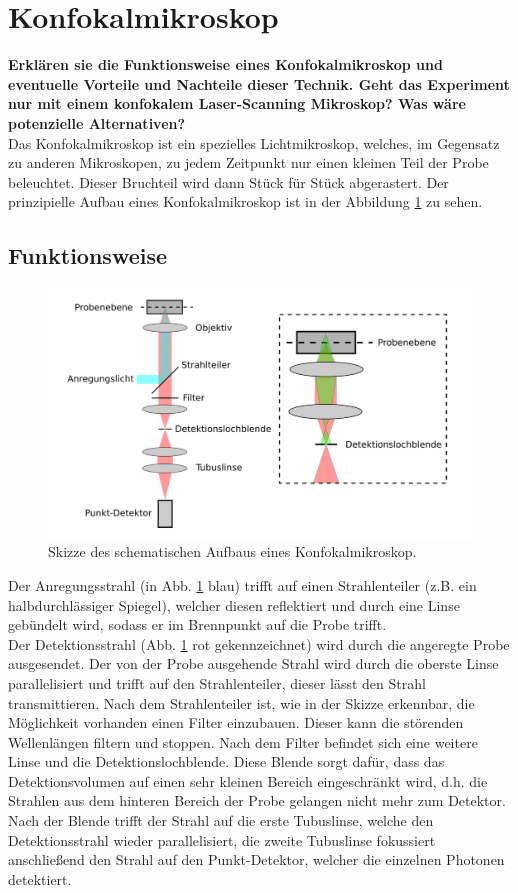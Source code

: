 \section{Konfokalmikroskop}
\textbf{Erklären sie die Funktionsweise eines Konfokalmikroskop und eventuelle Vorteile und
Nachteile dieser Technik. Geht das Experiment nur mit einem konfokalem Laser-Scanning Mikroskop? 
Was wäre potenzielle Alternativen?}\\
Das Konfokalmikroskop ist ein spezielles Lichtmikroskop, welches, 
im Gegensatz zu anderen Mikroskopen, zu jedem Zeitpunkt nur einen kleinen
Teil der Probe beleuchtet. Dieser Bruchteil wird dann Stück für 
Stück abgerastert.
Der prinzipielle Aufbau eines Konfokalmikroskop ist in der Abbildung \ref{fig:Konfokalmikroskop} zu sehen.
\newpage
\subsection{Funktionsweise}
\begin{figure}[h]
    \centering
    \includegraphics[scale=0.6]{Bilder/FzV/Konfokalmikroskop.png}
    \caption{Skizze des schematischen Aufbaus eines Konfokalmikroskop.\citep[vgl.][]{Anleitung} }
    \label{fig:Konfokalmikroskop}
   \end{figure}
Der Anregungsstrahl (in Abb. \ref{fig:Konfokalmikroskop} blau) trifft auf einen Strahlenteiler 
(z.B. ein halbdurchlässiger Spiegel), welcher diesen reflektiert und durch eine Linse gebündelt wird, 
sodass er im Brennpunkt auf die Probe trifft.\\
Der Detektionsstrahl (Abb. \ref{fig:Konfokalmikroskop} rot gekennzeichnet) wird durch 
die angeregte Probe ausgesendet. 
Der von der Probe ausgehende Strahl wird durch die oberste Linse parallelisiert und trifft
auf den Strahlenteiler, dieser lässt den Strahl transmittieren. Nach dem Strahlenteiler
ist, wie in der Skizze erkennbar, die Möglichkeit vorhanden einen Filter einzubauen. Dieser kann
die störenden Wellenlängen filtern und stoppen. 
Nach dem Filter befindet sich eine weitere Linse und die Detektionslochblende. Diese Blende sorgt
dafür, dass das Detektionsvolumen auf einen sehr kleinen Bereich eingeschränkt wird, d.h. die 
Strahlen aus dem hinteren Bereich der Probe gelangen nicht mehr zum Detektor. 
Nach der Blende trifft der Strahl auf die erste Tubuslinse, welche den Detektionsstrahl wieder parallelisiert, die 
zweite Tubuslinse fokussiert anschließend den Strahl auf den Punkt-Detektor, welcher
die einzelnen Photonen detektiert. \\
